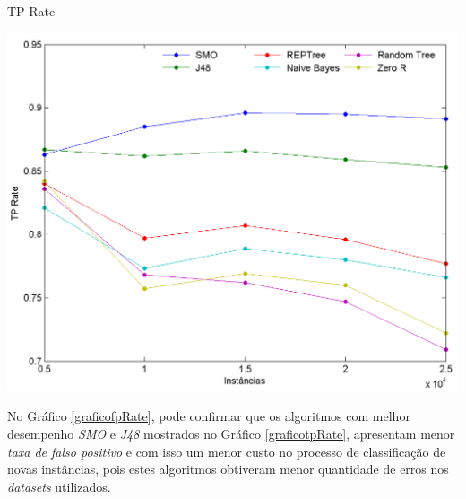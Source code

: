 \documentclass[
	12pt,				%
	openright,			%
	oneside,	
	a4paper,				%
	english,				%
	brazil				%
]{abntex2/abntex2} %
\begin{document}
\begin{grafico}[!htb]
	\caption{\label{graficotpRate}\fontsize{10}{\baselineskip} \selectfont TP Rate}
	\begin{center}
		\includegraphics[scale=0.6]{graphs/tp_graph.png}
	\end{center}
\end{grafico}

No Gráfico \ref{graficofpRate}, pode confirmar que os algoritmos com melhor desempenho \textit{SMO} e \textit{J48} mostrados no Gráfico \ref{graficotpRate}, apresentam menor \textit{taxa de falso positivo} e com isso um menor custo no processo de classificação de novas instâncias, pois estes algoritmos obtiveram menor quantidade de erros nos \textit{datasets} utilizados.
\end{document}
